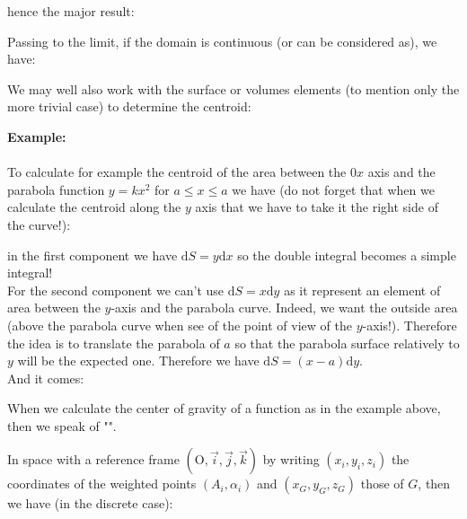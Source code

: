 	hence the major result:
	
	Passing to the limit, if the domain is continuous (or can be considered as), we have:
	
	We may well also work with the surface or volumes elements (to mention only the more trivial case) to determine the centroid:
	
	\begin{tcolorbox}[colframe=black,colback=white,sharp corners]
	\textbf{{\Large {}}Example:}\\\\
	To calculate for example the centroid of the area between the 0$x$ axis and the parabola function $y=kx^2$ for $a\leq x\leq a$ we have (do not forget that when we calculate the centroid along the $y$ axis that we have to take it the right side of the curve!):
	
	in the first component we have $\mathrm{d}S=y\mathrm{d}x$ so the double integral becomes a simple integral!\\
	
	For the second component we can't use $\mathrm{d}S=x\mathrm{d}y$ as it represent an element of area between the $y$-axis and the parabola curve. Indeed, we want the outside area (above the parabola curve when see of the point of view of the $y$-axis!). Therefore the idea is to translate the parabola of $a$ so that the parabola surface relatively to $y$ will be the expected one. Therefore we have $\mathrm{d}S=(x-a)\mathrm{d}y$.\\
	
	And it comes:
	
	\end{tcolorbox}
	\begin{tcolorbox}[title=Remark,colframe=black,arc=10pt]
	When we calculate the center of gravity of a function as in the example above, then we speak of "".
	\end{tcolorbox}
	In space with a reference frame $(\text{O},\vec{i},\vec{j},\vec{k})$ by writing $(x_i,y_i,z_i)$ the coordinates of the weighted points 
$(A_i,\alpha_i)$ and $(x_G,y_G,z_G)$ those of $G$, then we have (in the discrete case):
	
